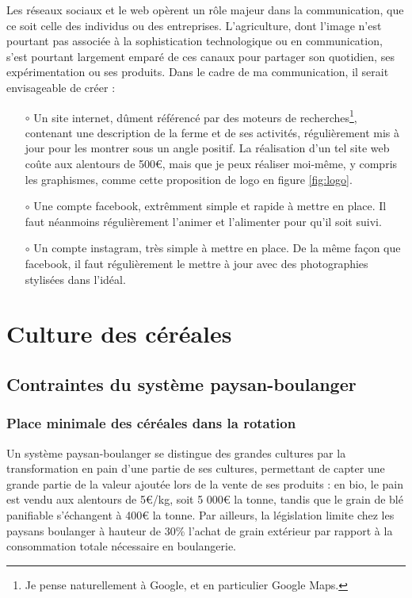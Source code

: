 \documentclass{book}
\begin{document}
Les réseaux sociaux et le web opèrent un rôle majeur dans la communication, que ce soit celle des individus ou des entreprises. L’agriculture, dont l’image n’est pourtant pas associée à la sophistication technologique ou en communication, s’est pourtant largement emparé de ces canaux pour partager son quotidien, ses expérimentation ou ses produits. Dans le cadre de ma communication, il serait envisageable de créer :
\begin{itemize}

	\item[$\circ$] Un site internet, dûment référencé par des moteurs de recherches\footnote{Je pense naturellement à Google, et en particulier Google Maps.}, contenant une description de la ferme et de ses activités, régulièrement mis à jour pour les montrer sous un angle positif. La réalisation d'un tel site web coûte aux alentours de 500\euro{}, mais que je peux réaliser moi-même, y compris les graphismes, comme cette proposition de logo en figure \ref{fig:logo}.
	
	\item[$\circ$] Une compte facebook, extrêmment simple et rapide à mettre en place. Il faut néanmoins régulièrement l'animer et l'alimenter pour qu'il soit suivi.
	
	\item[$\circ$] Un compte instagram, très simple à mettre en place. De la même façon que facebook, il faut régulièrement le mettre à jour avec des photographies stylisées dans l'idéal.

\end{itemize}

\chapter{Culture des céréales}
\label{chap:cereales}

\section{Contraintes du système paysan-boulanger}

\subsection{Place minimale des céréales dans la rotation}

Un système paysan-boulanger se distingue des grandes cultures par la transformation en pain d'une partie de ses cultures, permettant de capter une grande partie de la valeur ajoutée lors de la vente de ses produits : en bio, le pain est vendu aux alentours de 5\euro{}/kg, soit 5 000\euro{} la tonne, tandis que le grain de blé panifiable s'échangent à 400\euro{} la tonne. Par ailleurs, la législation limite chez les paysans boulanger à hauteur de 30\% l'achat de grain extérieur par rapport à la consommation totale nécessaire en boulangerie. 
\end{document}
